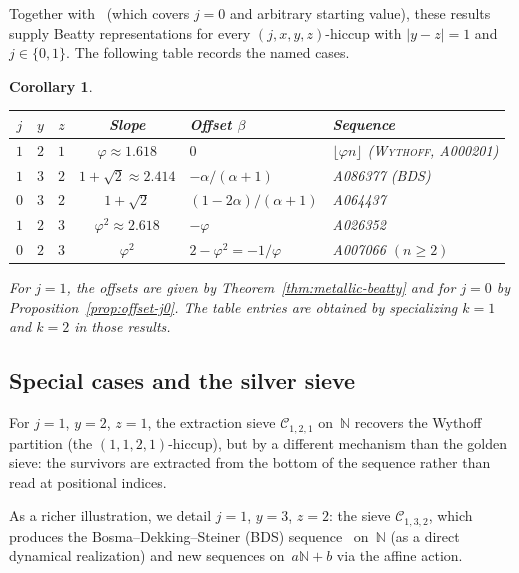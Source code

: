 \documentclass[11pt]{article}
\numberwithin{equation}{section}
\theoremstyle{plain}
\newtheorem{corollary}[theorem]{Corollary}
\theoremstyle{definition}
\theoremstyle{remark}
\newcommand{\N}{\mathbb{N}}
\begin{document}
Together with~\cite{Cloitre2025} (which covers $j=0$ and arbitrary starting value),
these results supply Beatty representations for every $(j,x,y,z)$-hiccup
with $|y-z|=1$ and $j\in\{0,1\}$.  The following table records the named cases.

\begin{corollary}\label{cor:named-cases}
\leavevmode
\begin{center}\small
\renewcommand{\arraystretch}{1.15}
\begin{tabular}{@{}ccccll@{}}
\toprule
$j$ & $y$ & $z$ & Slope & Offset $\beta$ & Sequence \\
\midrule
$1$ & $2$ & $1$ & $\varphi\approx1.618$ & $0$
  & $\lfloor\varphi n\rfloor$ (\textsc{Wythoff}, A000201) \\
$1$ & $3$ & $2$ & $1{+}\sqrt{2}\approx2.414$ & $-\alpha/(\alpha{+}1)$
  & A086377 (\textsc{BDS})\\
$0$ & $3$ & $2$ & $1{+}\sqrt{2}$ & $(1{-}2\alpha)/(\alpha{+}1)$
  & A064437 \\
$1$ & $2$ & $3$ & $\varphi^2\approx2.618$ & $-\varphi$
  & A026352 \\
$0$ & $2$ & $3$ & $\varphi^2$ & $2{-}\varphi^2=-1/\varphi$
  & A007066 $(n\ge2)$ \\
\bottomrule
\end{tabular}
\end{center}
For $j=1$, the offsets are given by
Theorem~\ref{thm:metallic-beatty}
and for $j=0$ by
Proposition~\ref{prop:offset-j0}.
The table entries are obtained by specializing $k=1$ and $k=2$
in those results.
\end{corollary}

\subsection{Special cases and the silver sieve}\label{sec:silver}

For $j=1$, $y=2$, $z=1$, the extraction sieve $\mathcal{C}_{1,2,1}$
on~$\N$ recovers the Wythoff partition (the $(1,1,2,1)$-hiccup),
but by a different mechanism than the golden sieve:
the survivors are extracted from the bottom of the sequence rather
than read at positional indices.

As a richer illustration, we detail $j=1$, $y=3$, $z=2$:
the sieve $\mathcal{C}_{1,3,2}$, which produces the
Bosma--Dekking--Steiner (BDS) sequence~\cite{BDS2018}
on~$\N$ (as a direct dynamical realization)
and new sequences on~$a\N+b$ via the affine action.
\end{document}
